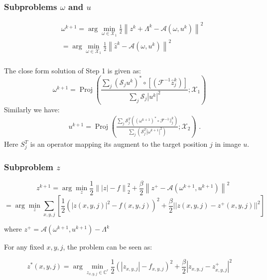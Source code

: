 \documentclass[UTF8]{beamer}
\begin{document}
\begin{frame}[c]\frametitle{Subproblems $\omega$ and $u$ }

$$
\begin{aligned}
&\omega^{k+1}=\arg \min _{\omega \in \mathcal{X}_{1}} \frac{1}{2}\left\|z^{k} + \Lambda^k -\mathcal{A}\left(\omega, u^{k}\right)\right\|^{2}\\
&=\arg \min _{\omega \in \mathcal{X}_{1}} \frac{1}{2}\left\|\hat{z}^{k}-\mathcal{A}\left(\omega, u^{k}\right)\right\|^{2}\\
\end{aligned}
$$
 
The close form solution of Step 1 is given as:
\begin{equation}
\omega^{k+1}=\operatorname{Proj}\left(\frac{ \sum_{j}\left(\mathcal{S}_{j} u^{k}\right)^{*} \circ [ \left(\mathcal{F}^{-1} \hat{z}_j^k\right) ]}{ \sum_{j}\mathcal{S}_{j} \left| u^{k} \right|^{2}} ; \mathcal{X}_{1}\right)
\label{omegaup}
\end{equation}  
Similarly we have:
\begin{equation}
\begin{aligned}
&\quad u^{k+1}=\operatorname{Proj}\left(\frac{\sum_{j} \mathcal{S}_{j}^{T}\left(\left(\omega^{k+1}\right)^{*} \circ \mathcal{F}^{-1} \hat{z}_{j}^{k}\right)}{\sum_{j}\left(\mathcal{S}_{j}^{T}\left|\omega^{k+1}\right|^{2}\right)} ; \mathcal{X}_{2}\right) \text { . }
\end{aligned}
\label{uup}
\end{equation}
Here $S_j^T$ is an operator mapping its augment to the target position $j$ in image $u$. 


\end{frame}

\begin{frame}[c]\frametitle{Subproblem $z$ }
 $$
  \quad z^{k+1}=\arg \min _{z} \frac{1}{2}\left\|\left|z\right|-f\right\|_{2}^{2} +\frac{\beta}{2}\left\|z^+-\mathcal{A}\left(\omega^{k+1}, u^{k+1}\right)\right\|^{2}
  $$
 $$
 = \arg \min _{z} \sum_{x,y,j} [\frac{1}{2} (  |z(x,y,j)|^2 - f(x,y,j) )^2 +
  \frac{\beta}{2}||z(x,y,j) - z^+(x,y,j)||^2 ]
 $$
 
 where $z^+ = \mathcal{A}\left(\omega^{k+1}, u^{k+1}\right) - \Lambda^{k}$
 
 For any fixed $x,y,j$, the problem can be seen as:
 
 $$
 z^*(x,y,j) = \arg \min_{z_{x,y,j} \in \mathbb{C}^{r}} \frac{1}{2} ( |z_{x,y,j}| - f_{x,y,j} )^2
 + \frac{\beta}{2} |z_{x,y,j} - z_{x,y,j}^+|^2
 $$
 
\end{frame}
\end{document}
